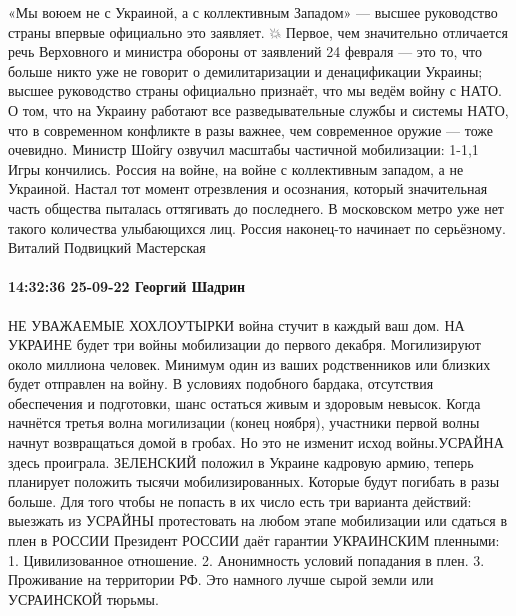 «Мы воюем не с Украиной, а с коллективным Западом» — высшее руководство страны впервые официально это заявляет.
💥 Первое, чем значительно отличается речь Верховного и министра обороны от заявлений 24 февраля — это то, что больше никто уже не говорит о демилитаризации и денацификации Украины; высшее руководство страны официально признаёт, что мы ведём войну с НАТО.
О том, что на Украину работают все разведывательные службы и системы НАТО, что в современном конфликте в разы важнее, чем современное оружие — тоже очевидно. Министр Шойгу озвучил масштабы частичной мобилизации: 1-1,1%
Игры кончились. Россия на войне, на войне с коллективным западом, а не Украиной. Настал тот момент отрезвления и осознания, который значительная часть общества пыталась оттягивать до последнего.
В московском метро уже нет такого количества улыбающихся лиц. Россия наконец-то начинает по серьёзному.
Виталий Подвицкий Мастерская

\paragraph{14:32:36 25-09-22 Георгий Шадрин}

НЕ УВАЖАЕМЫЕ ХОХЛОУТЫРКИ война стучит в каждый ваш дом.
НА УКРАИНЕ будет три войны мобилизации до первого декабря.
Могилизируют около миллиона человек. Минимум один из ваших родственников или близких будет отправлен на войну.
В условиях подобного бардака, отсутствия обеспечения и подготовки, шанс остаться живым и здоровым невысок.
Когда начнётся третья волна могилизации (конец ноября), участники первой волны начнут возвращаться домой в гробах.
Но это не изменит исход войны.УСРАЙНА здесь проиграла.
ЗЕЛЕНСКИЙ положил в Украине кадровую армию, теперь планирует положить тысячи мобилизированных.
Которые будут погибать в разы больше.
Для того чтобы не попасть в их число есть три варианта действий: выезжать из УСРАЙНЫ протестовать на любом этапе мобилизации или сдаться в плен в РОССИИ
Президент РОССИИ даёт гарантии УКРАИНСКИМ пленными:
1. Цивилизованное отношение.
2. Анонимность условий попадания в плен.
3. Проживание на территории РФ.
Это намного лучше сырой земли или УСРАИНСКОЙ тюрьмы.

